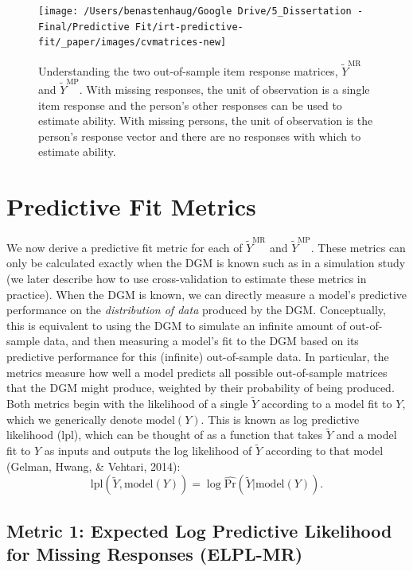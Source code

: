 \documentclass[
  english,
  man,floatsintext]{apa7}
\begin{document}
\begin{figure}

{\centering \texttt{[image: /Users/benastenhaug/Google Drive/5\_Dissertation - Final/Predictive Fit/irt-predictive-fit/\_paper/images/cvmatrices-new]}

}

\caption{Understanding the two out-of-sample item response matrices, $\tilde Y^{\text{MR}}$ and $\tilde Y^{\text{MP}}$. With missing responses, the unit of observation is a single item response and the person's other responses can be used to estimate ability. With missing persons, the unit of observation is the person's response vector and there are no responses with which to estimate ability.}\label{fig:elpl}
\end{figure}

\hypertarget{pfm}{%
\section{Predictive Fit Metrics}\label{pfm}}

We now derive a predictive fit metric for each of \(\tilde Y^{\text{MR}}\) and \(\tilde Y^{\text{MP}}\). These metrics can only be calculated exactly when the DGM is known such as in a simulation study (we later describe how to use cross-validation to estimate these metrics in practice). When the DGM is known, we can directly measure a model's predictive performance on the \emph{distribution of data} produced by the DGM. Conceptually, this is equivalent to using the DGM to simulate an infinite amount of out-of-sample data, and then measuring a model's fit to the DGM based on its predictive performance for this (infinite) out-of-sample data. In particular, the metrics measure how well a model predicts all possible out-of-sample matrices that the DGM might produce, weighted by their probability of being produced. Both metrics begin with the likelihood of a single \(\tilde{Y}\) according to a model fit to \(Y\), which we generically denote \(\text{model}(Y)\). This is known as log predictive likelihood (lpl), which can be thought of as a function that takes \(\tilde Y\) and a model fit to \(Y\) as inputs and outputs the log likelihood of \(\tilde Y\) according to that model (Gelman, Hwang, \& Vehtari, 2014):
\begin{equation}
\text{lpl}(\tilde{Y}, \text{model}(Y))  = \log \hat{\text{Pr}}(\tilde{Y} | \text{model}(Y)).
\end{equation}

\hypertarget{metric-1-expected-log-predictive-likelihood-for-missing-responses-elpl-mr}{%
\subsection{Metric 1: Expected Log Predictive Likelihood for Missing Responses (ELPL-MR)}\label{metric-1-expected-log-predictive-likelihood-for-missing-responses-elpl-mr}}
\end{document}
